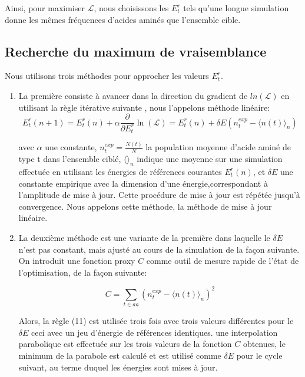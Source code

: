 Ainsi, pour maximiser $\mathcal{L}$, nous choisissons les ${E^r_t}$ tels qu'une longue simulation donne les mêmes fréquences d'acides aminés que l'ensemble cible.


\subsection{Recherche du maximum de vraisemblance}


Nous utilisons trois méthodes pour approcher les valeurs ${E^r_t}$.

\begin{enumerate}
  \label{enumMeth}
\item La première consiste à avancer dans la direction du gradient de $ln(\mathcal{L})$ en utilisant la règle itérative suivante \cite{Kleinman06}, nous l'appelons méthode linéaire:
\begin{equation} \label {eq: linear}
  E^r_t(n+1) = E^r_t(n) + \alpha \frac{\partial}{\partial E^r_t} \ln(\mathcal{L})=E^r_t(n) + \delta E (n^{exp}_t - \langle n(t)\rangle_n)
\end{equation} 

avec $\alpha$ une constante, $n^{exp}_t = \frac{N(t)}{N}$ la population moyenne d'acide aminé de type t dans l'ensemble ciblé,
$\langle\rangle_n$ indique une moyenne sur une simulation effectuée en utilisant les énergies de références courantes ${E^r_t(n)}$, et $\delta E$ une constante empirique avec la dimension d'une énergie,correspondant à l'amplitude de mise à jour. Cette procédure de mise à jour est répétée jusqu'à convergence. Nous appelons cette méthode, la méthode de mise à jour linéaire.

\item La deuxième méthode est une variante de la première dans laquelle le $\delta E$ n'est pas constant, mais ajusté au cours de la simulation de la façon suivante. On introduit une fonction proxy $C$ comme outil de mesure rapide de l'état de l'optimisation, de la façon suivante:

\begin{equation} \label {eq:proxy_function}
C =\sum_{t \in aa}(n^{exp}_t - \langle n(t)\rangle_n )^2
\end{equation} 

  Alors, la règle (11) est utilisée trois fois avec trois valeurs différentes pour le $\delta E$ ceci avec un jeu d'énergie de références identiques. une interpolation parabolique est effectuée sur les trois valeurs de la fonction $C$ obtenues, le minimum de la parabole est calculé et est utilisé comme $\delta E$ pour le cycle suivant, au terme duquel les énergies sont mises à jour.


\end{enumerate}
